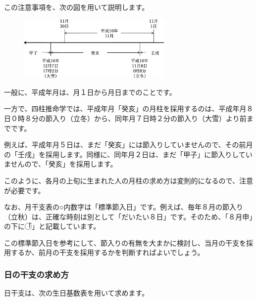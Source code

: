 \documentclass[a5paper,11pt,dvipdfmx]{tarticle}
\begin{document}
この注意事項を、次の図を用いて説明します。

\begin{figure}
  \includegraphics[width=75mm,angle=90]{figs/figure3-3.eps}
\end{figure}

一般に、平成年月は、月１日から月日までのことです。

一方で、四柱推命学では、平成年月「癸亥」の月柱を採用するのは、平成年月８日０時８分の節入り（立冬）から、同年月７日時２分の節入り（大雪）より前までです。

例えば、平成年月５日は、まだ「癸亥」には節入りしていませんので、その前月の「壬戌」を採用します。同様に、同年月２日は、まだ「甲子」に節入りしていませんので、「癸亥」を採用します。

このように、各月の上旬に生まれた人の月柱の求め方は変則的になるので、注意が必要です。

なお、月干支表の○内数字は「標準節入日」です。例えば、毎年８月の節入り（立秋）は、正確な時刻は別として「だいたい８日」です。そのため、「８月申」の下に「\textcircled{}」と記載しています。

この標準節入日を参考にして、節入りの有無を大まかに検討し、当月の干支を採用するか、前月の干支を採用するかを判断すればよいでしょう。


\subsubsection*{日の干支の求め方}

日干支は、次の生日基数表を用いて求めます。
\end{document}
